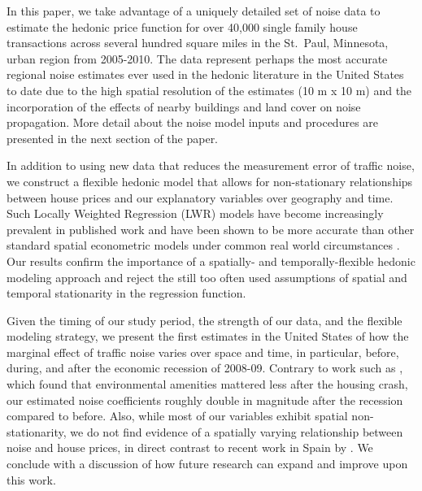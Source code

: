 \documentclass{article}\usepackage[]{graphicx}\usepackage[]{color}
\begin{document}
In this paper, we take advantage of a uniquely detailed set of noise data to estimate the hedonic price function for over 40,000 single family house transactions across several hundred square miles in the St.\ Paul, Minnesota, urban region from 2005-2010.  The data represent perhaps the most accurate regional noise estimates ever used in the hedonic literature in the United States to date due to the high spatial resolution of the estimates (10 m x 10 m) and the incorporation of the effects of nearby buildings and land cover on noise propagation. More detail about the noise model inputs and procedures are presented in the next section of the paper. 

In addition to using new data that reduces the measurement error of traffic noise, we construct a flexible hedonic model that allows for non-stationary relationships between house prices and our explanatory variables over geography and time. Such Locally Weighted Regression (LWR) models have become increasingly prevalent in published work \citep[see][]{MarmolejoDuarteCarlos;GonzalezTamez2009, McMillen2010, Carruthers2010, Sunding2010, Nappi-Choulet2011} and have been shown to be more accurate than other standard spatial econometric models under common real world circumstances \citep{McMillen2012}. Our results confirm the importance of a spatially- and temporally-flexible hedonic modeling approach and reject the still too often used assumptions of spatial and temporal stationarity in the regression function.

Given the timing of our study period, the strength of our data, and the flexible modeling strategy, we present the first estimates in the United States of how the marginal effect of traffic noise varies over space and time, in particular, before, during, and after the  economic recession of 2008-09. Contrary to work such as \citet{Cho2011b}, which found that environmental amenities mattered less after the housing crash, our estimated noise coefficients roughly double in magnitude after the recession compared to before. Also, while most of our variables exhibit spatial non-stationarity, we do not find evidence of a spatially varying relationship between noise and house prices, in direct contrast to recent work in Spain by \citet{MarmolejoDuarteCarlos;GonzalezTamez2009}. We conclude with a discussion of how future research can expand and improve upon this work.
\end{document}
